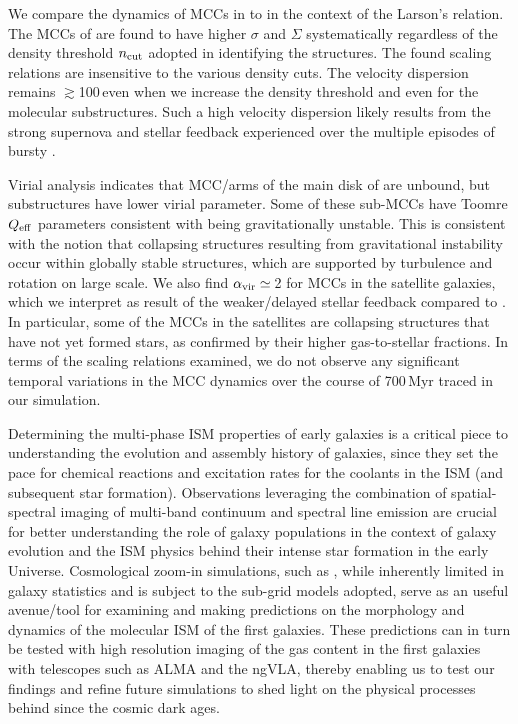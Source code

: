 \IfFileExists{emulateapjlegacy.cls}{\documentclass[iop]{emulateapjlegacy}}{\documentclass[iop]{emulateapj}}
\begin{document}
We compare the dynamics of MCCs in \flower to \obs in the context of the Larson's relation.
The MCCs of \flower are found to have higher $\sigma$ and $\Sigma$ systematically regardless of the
density threshold $n_{\rm cut}$ adopted in identifying the structures.
 The found scaling relations are insensitive to the various density cuts. 
 The velocity dispersion remains $\gtrsim$100\,\kms even when we increase the density threshold and 
 even for the molecular substructures. 
 Such a high velocity dispersion likely results from the strong supernova and stellar feedback \flower experienced 
 over the multiple episodes of bursty \SF.

Virial analysis indicates that MCC/arms of the main disk of \flower are unbound, but substructures have
lower virial parameter. Some of these sub-MCCs have Toomre $Q_{\rm eff}$ parameters consistent with being
gravitationally unstable. This is consistent with the notion that collapsing structures resulting from
gravitational instability occur within globally stable structures, which are
supported by turbulence and rotation on large scale.
We also find $\alpha_{\rm vir}\simeq$\,2 for MCCs in the satellite galaxies, which we interpret as
result of the weaker/delayed stellar feedback compared to \flower. 
In particular, some of the MCCs in the satellites are collapsing structures that have not yet formed stars, as confirmed by their
higher gas-to-stellar fractions.
In terms of the scaling relations examined, we do not observe any significant
temporal variations in the MCC dynamics over the course of 700\,Myr traced in our simulation.

Determining the multi-phase ISM properties of early galaxies
is a critical piece to understanding the evolution and
assembly history of galaxies, since they set the pace
for chemical reactions and excitation rates for the coolants in the ISM (and subsequent star formation).
Observations leveraging the combination of spatial-spectral imaging of
multi-band continuum and spectral line emission are crucial for better understanding
the role of \highz galaxy populations
in the context of galaxy evolution and the ISM physics behind their intense star formation in the early Universe.
Cosmological zoom-in simulations, such as , while inherently limited in galaxy
statistics and is subject to the sub-grid models adopted,
serve as an useful avenue/tool for examining and making predictions on the morphology and dynamics of
the molecular ISM of the first galaxies.
These predictions can in turn be
tested with high resolution imaging of the gas content in the first galaxies with telescopes such as ALMA and the ngVLA, thereby
enabling us to test our findings and refine future simulations to shed light on the physical processes behind
\SF since the cosmic dark ages.
\end{document}
